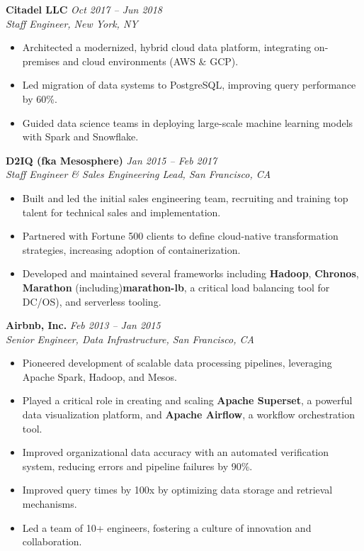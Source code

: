 \documentclass[margin,line]{resume}
\begin{document}
\begin{resume}
\textbf{Citadel LLC} \hfill \textit{Oct 2017 -- Jun 2018} \\
\textit{Staff Engineer, New York, NY}
\begin{itemize}[leftmargin=0.5cm]
    \item Architected a modernized, hybrid cloud data platform, integrating on-premises and cloud environments (AWS \& GCP).
    \item Led migration of data systems to PostgreSQL, improving query performance by 60\%.
    \item Guided data science teams in deploying large-scale machine learning models with Spark and Snowflake.
\end{itemize}

\textbf{D2IQ (fka Mesosphere)} \hfill \textit{Jan 2015 -- Feb 2017} \\
\textit{Staff Engineer \& Sales Engineering Lead, San Francisco, CA}
\begin{itemize}[leftmargin=0.5cm]
    \item Built and led the initial sales engineering team, recruiting and training top talent for technical sales and implementation.
    \item Partnered with Fortune 500 clients to define cloud-native transformation strategies, increasing adoption of containerization.
    \item Developed and maintained several frameworks including \textbf{Hadoop}, \textbf{Chronos}, \textbf{Marathon} (including)\textbf{marathon-lb}, a critical load balancing tool for DC/OS), and serverless tooling.
\end{itemize}

\textbf{Airbnb, Inc.} \hfill \textit{Feb 2013 -- Jan 2015} \\
\textit{Senior Engineer, Data Infrastructure, San Francisco, CA}
\begin{itemize}[leftmargin=0.5cm]
    \item Pioneered development of scalable data processing pipelines, leveraging Apache Spark, Hadoop, and Mesos.
    \item Played a critical role in creating and scaling \textbf{Apache Superset}, a powerful data visualization platform, and \textbf{Apache Airflow}, a workflow orchestration tool.
    \item Improved organizational data accuracy with an automated verification system, reducing errors and pipeline failures by 90\%.
    \item Improved query times by 100x by optimizing data storage and retrieval mechanisms.
    \item Led a team of 10+ engineers, fostering a culture of innovation and collaboration.
\end{itemize}


\end{resume}
\end{document}
